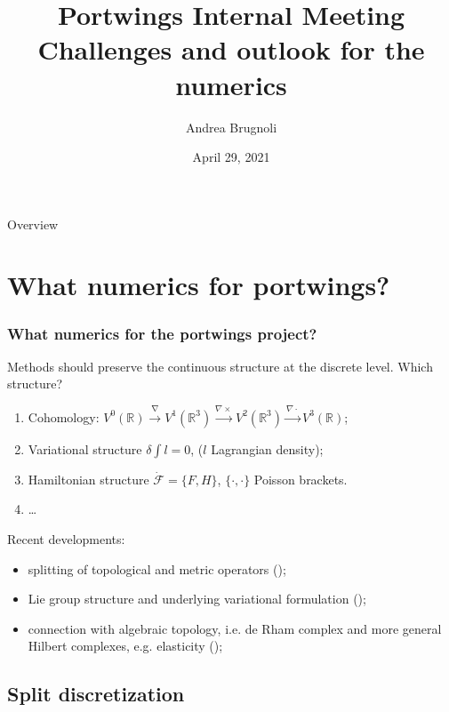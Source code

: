 \documentclass{beamer}
\title{Portwings Internal Meeting\\
Challenges and outlook for the numerics}
\author[A.~Brugnoli]{Andrea Brugnoli} %
\institute[UT]{Department of Robotics and Mechatronics,\\ University of Twente}
\date[29-04-2021]{April 29, 2021}
\newcommand{\bbR}{\mathbb{R}}
\begin{document}
\maketitle

\begin{frame}{Overview}
	\tableofcontents[currentsubsection, sectionstyle=show/show, subsectionstyle=show/shaded/show]
\end{frame}

\section{What numerics for portwings?}



\begin{frame}\frametitle{What numerics for the portwings project?}
Methods should preserve the continuous structure at the discrete level. Which structure? 
\begin{enumerate}
	\item Cohomology: $V^0(\bbR) \xrightarrow{\nabla} V^1(\bbR^3) \xrightarrow{\nabla \times} V^2(\bbR^3) \xrightarrow{\nabla \cdot} V^3(\bbR)$;
	\item Variational structure $\delta \int l = 0$, ($l$ Lagrangian density);
	\item Hamiltonian structure $\dot{\mathcal{F}} = \{F, H\}$, $\{\cdot, \cdot\}$ Poisson brackets.
	\item \dots
\end{enumerate}
\vspace{.1cm}
Recent developments:
\begin{itemize}
\item splitting of topological and metric operators (\cite{bauer2018split});
\item Lie group structure and underlying variational formulation (\cite{gawlik2020variational});
\item connection with algebraic topology, i.e. de Rham complex and more general Hilbert complexes, e.g. elasticity (\cite{bochev2006mimetic,arnold2006acta,palha2014compatible}); 
\end{itemize}

\end{frame}

\subsection{Split discretization}
\end{document}
